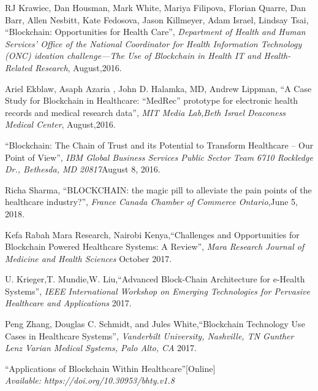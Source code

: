 \documentclass[12pt]{report}
\begin{document}
\begin{thebibliography}{100} 

 RJ Krawiec, Dan Housman, Mark White, Mariya Filipova,
Florian Quarre, Dan Barr, Allen Nesbitt, Kate Fedosova,
Jason Killmeyer, Adam Israel, Lindsay Tsai, \textquotedblleft Blockchain:
Opportunities for Health Care\textquotedblright, \textit{Department of Health and Human Services’ Office of the National Coordinator for Health
Information Technology (ONC) ideation challenge—The Use of Blockchain in Health IT and Health-Related Research}, August,2016.


 Ariel Ekblaw, Asaph Azaria , John D. Halamka, MD, Andrew Lippman, \textquotedblleft A Case Study for Blockchain in Healthcare:
“MedRec” prototype for electronic health records and medical research data\textquotedblright, \textit{MIT Media Lab,Beth Israel Deaconess Medical Center}, August,2016.


 \textquotedblleft Blockchain: The Chain of Trust and its Potential to Transform Healthcare – Our Point of View\textquotedblright, \textit{IBM Global Business Services Public Sector Team 6710 Rockledge Dr., Bethesda, MD 20817}August 8, 2016.

 Richa Sharma, \textquotedblleft BLOCKCHAIN: the magic pill to alleviate the pain
points of the healthcare industry?\textquotedblright, \textit{France Canada Chamber of Commerce Ontario},June 5, 2018.

Kefa Rabah Mara Research, Nairobi Kenya,\textquotedblleft Challenges and Opportunities for Blockchain Powered Healthcare Systems: A Review\textquotedblright, \textit{Mara Research Journal of Medicine and Health Sciences} October 2017.

U. Krieger,T. Mundie,W. Liu,\textquotedblleft Advanced Block-Chain Architecture for e-Health Systems\textquotedblright, \textit{IEEE International
Workshop on Emerging Technologies for Pervasive Healthcare and Applications} 2017.

Peng Zhang, Douglas C. Schmidt, and Jules White,\textquotedblleft Blockchain Technology Use Cases in Healthcare Systems\textquotedblright, \textit{Vanderbilt University, Nashville, TN Gunther Lenz
Varian Medical Systems, Palo Alto, CA} 2017.


 \textquotedblleft Applications of Blockchain Within Healthcare\textquotedblright[Online]\\ 
\textit{Available: https://doi.org/10.30953/bhty.v1.8}



\end{thebibliography}
\end{document}
